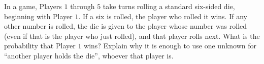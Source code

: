 In a game, Players $1$ through $5$ take turns rolling a standard six-sided die, beginning with Player $1$. If a six is rolled, the player who rolled it wins. If any other number is rolled, the die is given to the player whose number was rolled (even if that is the player who just rolled), and that player rolls next. What is the probability that Player $1$ wins? Explain why it is enough to use one unknown for ``another player holds the die'', whoever that player is.
